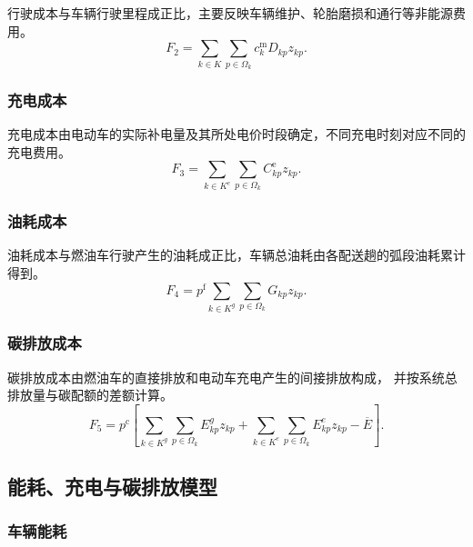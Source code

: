\documentclass{setp-new}
\begin{document}
行驶成本与车辆行驶里程成正比，主要反映车辆维护、轮胎磨损和通行等非能源费用。
\begin{equation}
F_2=\sum_{k\in K}\sum_{p\in\Omega_k}c_k^{\mathrm m}D_{kp}z_{kp}.
\label{eq:unified-f2}
\end{equation}

\subsubsection{充电成本}

充电成本由电动车的实际补电量及其所处电价时段确定，不同充电时刻对应不同的充电费用。
\begin{equation}
F_3=\sum_{k\in K^{e}}\sum_{p\in\Omega_k}C_{kp}^{\mathrm e}z_{kp}.
\label{eq:unified-f3}
\end{equation}

\subsubsection{油耗成本}

油耗成本与燃油车行驶产生的油耗成正比，车辆总油耗由各配送趟的弧段油耗累计得到。
\begin{equation}
F_4=p^{\mathrm f}\sum_{k\in K^{g}}\sum_{p\in\Omega_k}G_{kp}z_{kp}.
\label{eq:unified-f4}
\end{equation}

\subsubsection{碳排放成本}

碳排放成本由燃油车的直接排放和电动车充电产生的间接排放构成，
并按系统总排放量与碳配额的差额计算。
\begin{equation}
F_5=p^{\mathrm c}\left[
\sum_{k\in K^{g}}\sum_{p\in\Omega_k}E_{kp}^{g}z_{kp}
+\sum_{k\in K^{e}}\sum_{p\in\Omega_k}E_{kp}^{e}z_{kp}
-\overline E
\right].
\label{eq:unified-f5}
\end{equation}

\subsection{能耗、充电与碳排放模型}

\subsubsection{车辆能耗}
\end{document}
